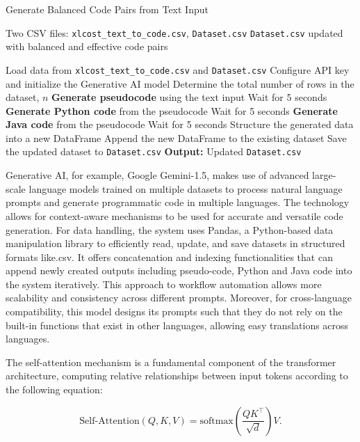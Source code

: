 \documentclass{dhbenelux}
\begin{document}
\begin{algorithm}
\caption{Generate Balanced Code Pairs from Text Input}
\label{alg:balanced_code_pairs}
\begin{algorithmic}[1]
\Require Two CSV files: \texttt{xlcost\_text\_to\_code.csv}, \texttt{Dataset.csv}
\Ensure \texttt{Dataset.csv} updated with balanced and effective code pairs

\State Load data from \texttt{xlcost\_text\_to\_code.csv} and \texttt{Dataset.csv}
\State Configure API key and initialize the Generative AI model
\State Determine the total number of rows in the dataset, $n$
    \State \textbf{Generate pseudocode} using the text input
    \State Wait for 5 seconds
    \State \textbf{Generate Python code} from the pseudocode
    \State Wait for 5 seconds
    \State \textbf{Generate Java code} from the pseudocode
    \State Wait for 5 seconds
    \State Structure the generated data into a new DataFrame
    \State Append the new DataFrame to the existing dataset
    \State Save the updated dataset to \texttt{Dataset.csv}
\EndFor
\State \textbf{Output:} Updated \texttt{Dataset.csv}
\end{algorithmic}
\label{alg:generate-balanced-code}
\end{algorithm}

Generative AI, for example, Google Gemini-1.5, makes use of advanced large-scale language models trained on multiple datasets to process natural language prompts and generate programmatic code in multiple languages. The technology allows for context-aware mechanisms to be used for accurate and versatile code generation. For data handling, the system uses Pandas, a Python-based data manipulation library to efficiently read, update, and save datasets in structured formats like.csv. It offers concatenation and indexing functionalities that can append newly created outputs including pseudo-code, Python and Java code into the system iteratively. This approach to workflow automation allows more scalability and consistency across different prompts. Moreover, for cross-language compatibility, this model designs its prompts such that they do not rely on the built-in functions that exist in other languages, allowing easy translations across languages.

The self-attention mechanism is a fundamental component of the transformer architecture, computing relative relationships between input tokens according to the following equation:

\begin{equation}
\text{Self-Attention}(Q, K, V) = \text{softmax}\left(\frac{QK^\top}{\sqrt{d}}\right)V.
\label{eq:self-attention}
\end{equation}
\end{document}
